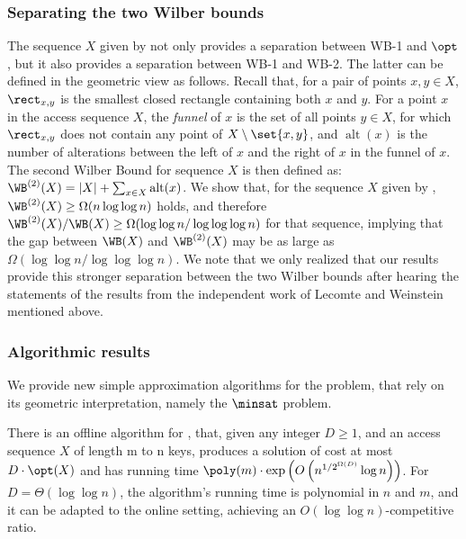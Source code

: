 \documentclass{toc}
\begin{document}
\subsubsection{Separating the two Wilber bounds} The sequence $X$ given by  not only provides a separation between WB-1 and $\opt$, but it also provides a separation between WB-1 and WB-2. The latter can be defined in the geometric view as follows. Recall that, for a pair of points $x,y\in X$, $\rect_{x,y}$ is the smallest closed rectangle containing both $x$ and $y$. For a point $x$ in the access sequence $X$, the \emph{funnel} of $x$ is the set of all points $y\in X$, for which $\rect_{x,y}$ does not contain any point of $X\setminus\set{x,y}$, and $\operatorname{alt}(x)$ is the number of alterations between the left of $x$ and the right of $x$ in the {funnel} of $x$. The second Wilber Bound for sequence $X$ is then defined as: $\WB^{(2)}(X)=|X|+\sum_{x\in X}\operatorname{alt}(x)$. 
We show that, for the sequence $X$ given by , $\WB^{(2)}(X) \geq \Omega(n \log \log n)$ holds, and therefore $\WB^{(2)}(X)/\WB(X) \geq \Omega(\log \log n/ \log \log \log n)$ for that sequence, implying that  the gap between $\WB(X)$ and $\WB^{(2)}(X)$ may be as large as $\Omega(\log \log n/ \log \log \log n)$. 
We note that we only realized that our results provide this stronger separation between the two Wilber bounds after hearing the statements of the results from the independent work of Lecomte and Weinstein~\cite{LW19}  mentioned above.   



\subsubsection{Algorithmic results}

We provide new simple approximation algorithms for the problem, that rely on its geometric interpretation, namely the $\minsat$ problem.




\begin{theorem}
\label{thm:intro_alg} There  is
an offline algorithm for \minsat, that, given any integer $D\ge1$, and an access sequence $X$ of length m to n keys, produces a solution of cost at most $D\cdot\opt(X)$ and has running
time  $\poly(m) \cdot \exp\left(O\left (n^{1/2^{\Omega(D)}}\log n\right )\right )$.  
For 
$D=\Theta(\log\log n)$, the algorithm's running time is polynomial in $n$ and $m$, and it can be adapted to the online setting, achieving an $O(\log\log n)$-competitive ratio.
\end{theorem}
\end{document}
